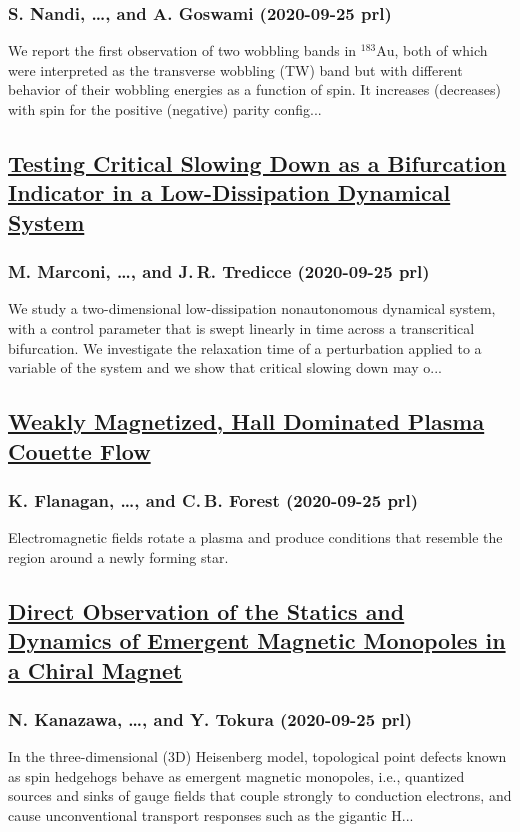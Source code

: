 \subsubsection*{S. Nandi, \dots, and A. Goswami (2020-09-25 prl)}
We report the first observation of two wobbling bands in $^{183}\mathrm{Au}$, both of which were interpreted as the transverse wobbling (TW) band but with different behavior of their wobbling energies as a function of spin. It increases (decreases) with spin for the positive (negative) parity config...
\subsection*{\href{http://link.aps.org/doi/10.1103/PhysRevLett.125.134102}{Testing Critical Slowing Down as a Bifurcation Indicator in a Low-Dissipation Dynamical System}}
\subsubsection*{M. Marconi, \dots, and J. R. Tredicce (2020-09-25 prl)}
We study a two-dimensional low-dissipation nonautonomous dynamical system, with a control parameter that is swept linearly in time across a transcritical bifurcation. We investigate the relaxation time of a perturbation applied to a variable of the system and we show that critical slowing down may o...
\subsection*{\href{http://link.aps.org/doi/10.1103/PhysRevLett.125.135001}{Weakly Magnetized, Hall Dominated Plasma Couette Flow}}
\subsubsection*{K. Flanagan, \dots, and C. B. Forest (2020-09-25 prl)}
Electromagnetic fields rotate a plasma and produce conditions that resemble the region around a newly forming star.
\subsection*{\href{http://link.aps.org/doi/10.1103/PhysRevLett.125.137202}{Direct Observation of the Statics and Dynamics of Emergent Magnetic Monopoles in a Chiral Magnet}}
\subsubsection*{N. Kanazawa, \dots, and Y. Tokura (2020-09-25 prl)}
In the three-dimensional (3D) Heisenberg model, topological point defects known as spin hedgehogs behave as emergent magnetic monopoles, i.e., quantized sources and sinks of gauge fields that couple strongly to conduction electrons, and cause unconventional transport responses such as the gigantic H...

